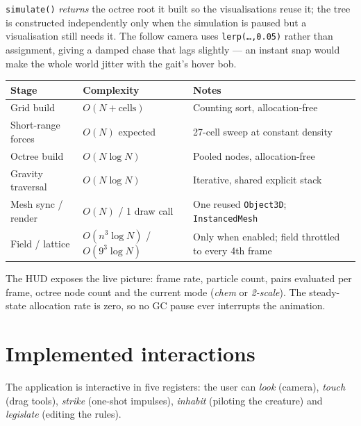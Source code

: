 \documentclass[10pt,a4paper]{article}
\newcommand{\code}[1]{\texttt{\small #1}}
\begin{document}
\noindent \code{simulate()} \emph{returns} the octree root it built so the visualisations reuse it; the
tree is constructed independently only when the simulation is paused but a visualisation still needs it.
The follow camera uses \code{lerp(\ldots,0.05)} rather than assignment, giving a damped chase that lags
slightly --- an instant snap would make the whole world jitter with the gait's hover bob.

\begin{center}
\small
\begin{tabular}{@{}lll@{}}
\toprule
\textbf{Stage} & \textbf{Complexity} & \textbf{Notes}\\
\midrule
Grid build         & $O(N + \text{cells})$ & Counting sort, allocation-free\\
Short-range forces & $O(N)$ expected       & 27-cell sweep at constant density\\
Octree build       & $O(N \log N)$         & Pooled nodes, allocation-free\\
Gravity traversal  & $O(N \log N)$         & Iterative, shared explicit stack\\
Mesh sync / render & $O(N)$ / 1 draw call  & One reused \code{Object3D}; \code{InstancedMesh}\\
Field / lattice    & $O(n^3\log N)$ / $O(9^3\log N)$ & Only when enabled; field throttled to every 4th frame\\[-1pt]
\bottomrule
\end{tabular}
\end{center}

\noindent The HUD exposes the live picture: frame rate, particle count, pairs evaluated per frame, octree
node count and the current mode (\emph{chem} or \emph{2-scale}). The steady-state allocation rate is zero,
so no GC pause ever interrupts the animation.

\section{Implemented interactions}
\label{sec:interactions}

The application is interactive in five registers: the user can \emph{look} (camera), \emph{touch} (drag
tools), \emph{strike} (one-shot impulses), \emph{inhabit} (piloting the creature) and \emph{legislate}
(editing the rules).
\end{document}
